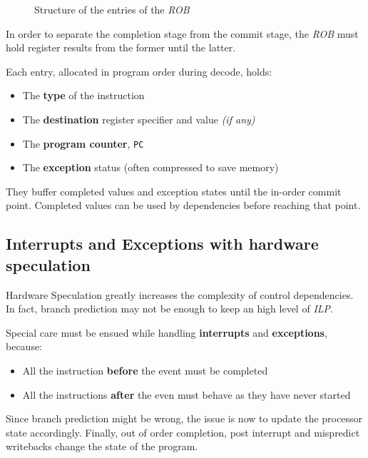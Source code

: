 \documentclass[english]{article}
\begin{document}
\begin{figure}[htbp]
  \bigskip
  \centering
  \caption{Structure of the entries of the \textit{ROB}}
  \label{fig:structure-entries-rob}
  \bigskip
\end{figure}

\bigskip
In order to separate the completion stage from the commit stage, the \textit{ROB} must hold register results from the former until the latter.

Each entry, allocated in program order during decode, holds:

\begin{itemize}
  \item The \textbf{type} of the instruction
  \item The \textbf{destination} register specifier and value \textit{(if any)}
  \item The \textbf{program counter}, \texttt{PC}
  \item The \textbf{exception} status (often compressed to save memory)
\end{itemize}

They buffer completed values and exception states until the in-order commit point.
Completed values can be used by dependencies before reaching that point.

\subsection{Interrupts and Exceptions with hardware speculation}

Hardware Speculation greatly increases the complexity of control dependencies.
In fact, branch prediction may not be enough to keep an high level of \textit{ILP}.

Special care must be ensued while handling \textbf{interrupts} and \textbf{exceptions}, because:

\begin{itemize}
  \item All the instruction \textbf{before} the event must be completed
  \item All the instructions \textbf{after} the even must behave as they have never started
\end{itemize}

Since branch prediction might be wrong, the issue is now to update the processor state accordingly.
Finally, out of order completion, post interrupt and mispredict writebacks change the state of the program.
\end{document}
